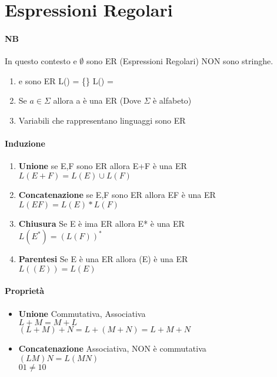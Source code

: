\documentclass[12pt, a4paper, openany]{book}
\begin{document}
\section*{Espressioni Regolari}
\paragraph*{NB} In questo contesto \eps e $\emptyset$ sono ER (Espressioni
Regolari) NON sono stringhe.
\begin{enumerate}
    \item \eps e \empt sono ER \ra L(\eps) = \{\eps\} L(\empt) = \empt
    \item Se $a \in \Sigma$ allora a è una ER (Dove $\Sigma$ è alfabeto)
    \item Variabili che rappresentano linguaggi sono ER
\end{enumerate}
\paragraph*{Induzione}
\begin{enumerate}
    \item \textbf{Unione} \ra se E,F sono ER allora E+F è una ER \\
    $L(E+F) = L(E)\cup L(F)$
    \item \textbf{Concatenazione} \ra se E,F sono ER allora EF è una ER \\
    $L(EF) = L(E)*L(F)$
    \item \textbf{Chiusura} \ra Se E è ima ER allora E* è una ER \\
    $L(E^*) = (L(F))^*$
    \item \textbf{Parentesi} \ra Se E è una ER allora (E) è una ER \\
    $L((E)) = L(E)$
\end{enumerate}
\paragraph*{Proprietà}
\begin{itemize}
    \item \textbf{Unione} \ra Commutativa, Associativa \\
    $L+M = M+L$ \\ $(L+M)+N = L+(M+N) = L+M+N$
    \item \textbf{Concatenazione} \ra Associativa, NON è commutativa \\
    $(LM)N=L(MN)$ \\ $01 \neq 10$
\end{itemize}
\end{document}
